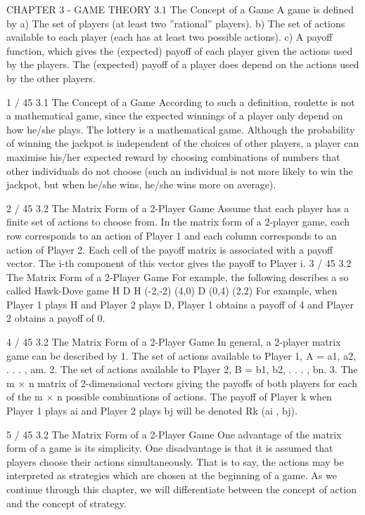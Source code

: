 
CHAPTER 3 - GAME THEORY
3.1 The Concept of a Game
A game is defined by
a) The set of players (at least two ”rational” players).
b) The set of actions available to each player (each has at least
two possible actions).
c) A payoff function, which gives the (expected) payoff of each
player given the actions used by the players. The (expected) payoff
of a player does depend on the actions used by the other players.

1 / 45
3.1 The Concept of a Game
According to such a definition, roulette is not a mathematical
game, since the expected winnings of a player only depend on how
he/she plays.
The lottery is a mathematical game. Although the probability of
winning the jackpot is independent of the choices of other players,
a player can maximise his/her expected reward by choosing
combinations of numbers that other individuals do not choose
(such an individual is not more likely to win the jackpot, but when
he/she wins, he/she wins more on average).

2 / 45
3.2 The Matrix Form of a 2-Player Game
Assume that each player has a finite set of actions to choose from.
In the matrix form of a 2-player game, each row corresponds to an
action of Player 1 and each column corresponds to an action of
Player 2.
Each cell of the payoff matrix is associated with a payoff vector.
The i-th component of this vector gives the payoff to Player i.
3 / 45
3.2 The Matrix Form of a 2-Player Game
For example, the following describes a so called Hawk-Dove game
H D
H (-2,-2) (4,0)
D (0,4) (2,2)
For example, when Player 1 plays H and Player 2 plays D, Player 1
obtains a payoff of 4 and Player 2 obtains a payoff of 0.

4 / 45
3.2 The Matrix Form of a 2-Player Game
In general, a 2-player matrix game can be described by
1. The set of actions available to Player 1,
A = {a1, a2, . . . , am}.
2. The set of actions available to Player 2,
B = {b1, b2, . . . , bn}.
3. The m × n matrix of 2-dimensional vectors giving the
payoffs of both players for each of the m × n possible
combinations of actions. The payoff of Player k when
Player 1 plays ai and Player 2 plays bj will be
denoted Rk (ai
, bj).

5 / 45
3.2 The Matrix Form of a 2-Player Game
One advantage of the matrix form of a game is its simplicity.
One disadvantage is that it is assumed that players choose their
actions simultaneously. That is to say, the actions may be
interpreted as strategies which are chosen at the beginning of a
game.
As we continue through this chapter, we will differentiate between
the concept of action and the concept of strategy.

